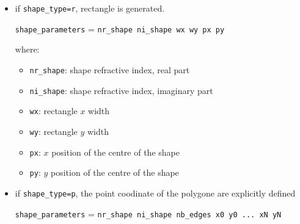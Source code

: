 \begin{itemize}
\begin{itemize}
    	\item if \lstinline!shape_type=r!, rectangle is generated.
        
        	\lstinline!shape_parameters! = \lstinline!nr_shape ni_shape wx wy px py!
        	
        	where:
		    \begin{itemize}
	    		\item \lstinline!nr_shape!: shape refractive index, real part
				\item \lstinline!ni_shape!: shape refractive index, imaginary part
				\item \lstinline!wx!: rectangle $x$ width
				\item \lstinline!wy!: rectangle $y$ width
				\item \lstinline!px!: $x$ position of the centre of the shape 
				\item \lstinline!py!: $y$ position of the centre of the shape
	    	\end{itemize}
	    	
    	\item if \lstinline!shape_type=p!, the point coodinate of the polygone are explicitly defined
        
        	\lstinline!shape_parameters! = \lstinline!nr_shape ni_shape nb_edges x0 y0 ... xN yN!
        	

\end{itemize}
\end{itemize}
